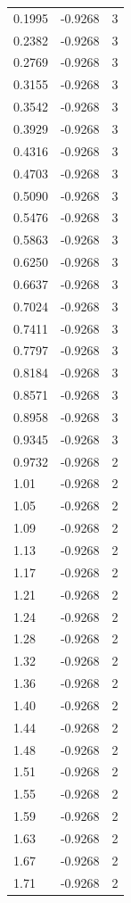 \begin{longtable}{lrr}
  0.1995 & -0.9268 & 3 \\
  0.2382 & -0.9268 & 3 \\
  0.2769 & -0.9268 & 3 \\
  0.3155 & -0.9268 & 3 \\
  0.3542 & -0.9268 & 3 \\
  0.3929 & -0.9268 & 3 \\
  0.4316 & -0.9268 & 3 \\
  0.4703 & -0.9268 & 3 \\
  0.5090 & -0.9268 & 3 \\
  0.5476 & -0.9268 & 3 \\
  0.5863 & -0.9268 & 3 \\
  0.6250 & -0.9268 & 3 \\
  0.6637 & -0.9268 & 3 \\
  0.7024 & -0.9268 & 3 \\
  0.7411 & -0.9268 & 3 \\
  0.7797 & -0.9268 & 3 \\
  0.8184 & -0.9268 & 3 \\
  0.8571 & -0.9268 & 3 \\
  0.8958 & -0.9268 & 3 \\
  0.9345 & -0.9268 & 3 \\
  0.9732 & -0.9268 & 2 \\
  1.01 & -0.9268 & 2 \\
  1.05 & -0.9268 & 2 \\
  1.09 & -0.9268 & 2 \\
  1.13 & -0.9268 & 2 \\
  1.17 & -0.9268 & 2 \\
  1.21 & -0.9268 & 2 \\
  1.24 & -0.9268 & 2 \\
  1.28 & -0.9268 & 2 \\
  1.32 & -0.9268 & 2 \\
  1.36 & -0.9268 & 2 \\
  1.40 & -0.9268 & 2 \\
  1.44 & -0.9268 & 2 \\
  1.48 & -0.9268 & 2 \\
  1.51 & -0.9268 & 2 \\
  1.55 & -0.9268 & 2 \\
  1.59 & -0.9268 & 2 \\
  1.63 & -0.9268 & 2 \\
  1.67 & -0.9268 & 2 \\
  1.71 & -0.9268 & 2 \\

\end{longtable}
